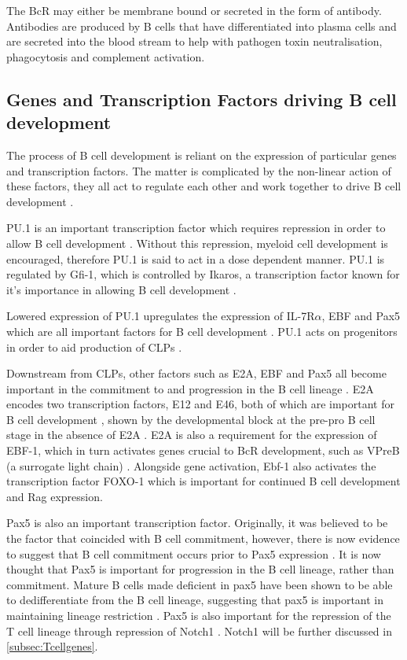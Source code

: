The BcR may either be membrane bound or secreted in the form of antibody.
Antibodies are produced by B cells that have differentiated into plasma cells and are secreted into the blood stream to help with pathogen toxin neutralisation, phagocytosis and complement activation\citep{Janeway2008}.


\subsection{Genes and Transcription Factors driving B cell development}
\label{subsec:Bcellgenes}

The process of B cell development is reliant on the expression of particular genes and transcription factors.
The matter is complicated by the non-linear action of these factors, they all act to regulate each other and work together to drive B cell development \citep{Mandel2010}.

PU.1 is an important transcription factor which requires repression in order to allow B cell development \citep{Dekoter2000}. 
Without this repression, myeloid cell development is encouraged, therefore PU.1 is said to act in a dose dependent manner.
PU.1 is regulated by Gfi-1, which is controlled by Ikaros, a transcription factor known for it's importance in allowing B cell development \citep{Yoshida2006, Busslinger2004}. 

Lowered expression of PU.1 upregulates the expression of IL-7R$\alpha$, EBF and Pax5 which are all important factors for B cell development \citep{Hagman2006}.
PU.1 acts on progenitors in order to aid production of CLPs \citep{Hagman2006}.

Downstream from CLPs, other factors such as E2A, EBF and Pax5 all become important in the commitment to and progression in the B cell lineage \citep{Mansson2008}.
E2A encodes two transcription factors, E12 and E46, both of which are important for B cell development \citep{Bain1997}, shown by the developmental block at the pre-pro B cell stage in the absence of E2A \citep{Bain1994}.
E2A is also a requirement for the expression of EBF-1, which in turn activates genes crucial to BcR development, such as VPreB (a surrogate light chain) \citep{Welinder2011}.
Alongside gene activation, Ebf-1 also activates the transcription factor FOXO-1 which is important for continued B cell development and Rag expression\citep{Amin2008}.

Pax5 is also an important transcription factor.
Originally, it was believed to be the factor that coincided with B cell commitment, however, there is now evidence to suggest that B cell commitment occurs prior to Pax5 expression \citep{Mansson2008}.
It is now thought that Pax5 is important for progression in the B cell lineage, rather than commitment.
Mature B cells made deficient in pax5 have been shown to be able to dedifferentiate from the B cell lineage, suggesting that pax5 is important in maintaining lineage restriction \citep{Cobaleda2007}.
Pax5 is also important for the repression of the T cell lineage through repression of Notch1 \citep{Souabni2002}.
Notch1 will be further discussed in \cref{subsec:Tcellgenes}.

